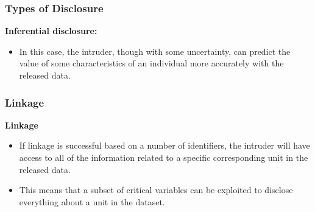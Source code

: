 \documentclass{beamer}
\begin{document}
\begin{frame}
	\frametitle{Types of Disclosure}
\textbf{Inferential disclosure:}
\begin{itemize}
	
	\item In this case, the intruder, though with some uncertainty,
	can predict the value of some characteristics of an individual more accurately with the released data.
\end{itemize}
\end{frame}
\begin{frame}
\frametitle{Linkage}
\textbf{Linkage}
\begin{itemize}
	
\item If linkage is successful based on a number of identifiers, the intruder will have
	access to all of the information related to a specific corresponding unit in the
	released data. 
\item This means that a subset of critical variables can be exploited to
	disclose everything about a unit in the dataset.
\end{itemize}

\end{frame}
\end{document}

